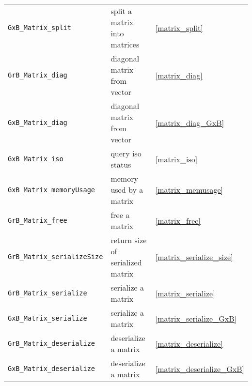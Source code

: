 \documentclass[12pt]{article}
\begin{document}
{\begin{tabular}{lll}
\verb'GxB_Matrix_split'         & split a matrix into matrices          & \ref{matrix_split} \\
\verb'GrB_Matrix_diag'          & diagonal matrix from vector           & \ref{matrix_diag} \\
\verb'GxB_Matrix_diag'          & diagonal matrix from vector           & \ref{matrix_diag_GxB} \\
\verb'GxB_Matrix_iso'           & query iso status                      & \ref{matrix_iso} \\
\verb'GxB_Matrix_memoryUsage'   & memory used by a matrix               & \ref{matrix_memusage} \\
\verb'GrB_Matrix_free'          & free a matrix                         & \ref{matrix_free} \\
\hline
\hline
\verb'GrB_Matrix_serializeSize' & return size of serialized matrix & \ref{matrix_serialize_size} \\
\verb'GrB_Matrix_serialize'     & serialize a matrix               & \ref{matrix_serialize} \\
\verb'GxB_Matrix_serialize'     & serialize a matrix               & \ref{matrix_serialize_GxB} \\
\verb'GrB_Matrix_deserialize'   & deserialize a matrix             & \ref{matrix_deserialize} \\
\verb'GxB_Matrix_deserialize'   & deserialize a matrix             & \ref{matrix_deserialize_GxB} \\
\hline
\end{tabular}
}
\end{document}
